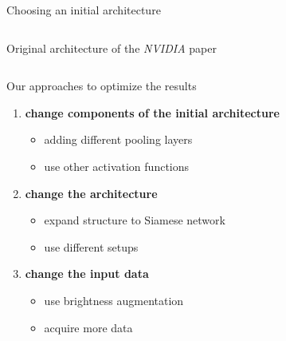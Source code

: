 \begin{frame}{Choosing an initial architecture}
\begin{columns}[c]
\begin{column}{0.4\textwidth}
			{\footnotesize Original architecture of the \textit{NVIDIA} paper \cite{NVIDIA2016}}
		\end{column}
	\end{columns}
\end{frame}

\begin{frame}{Our approaches to optimize the results}
	\begin{enumerate}
		\item \textbf{change components of the initial architecture}
		\begin{itemize}
			\item adding different pooling layers
			\item use other activation functions
		\end{itemize}
		\item \textbf{change the architecture}
		\begin{itemize}
			\item expand structure to Siamese network
			\item use different setups
		\end{itemize}
		\item \textbf{change the input data}
		\begin{itemize}
			\item use brightness augmentation
			\item acquire more data
		\end{itemize}
	\end{enumerate}
\end{frame}